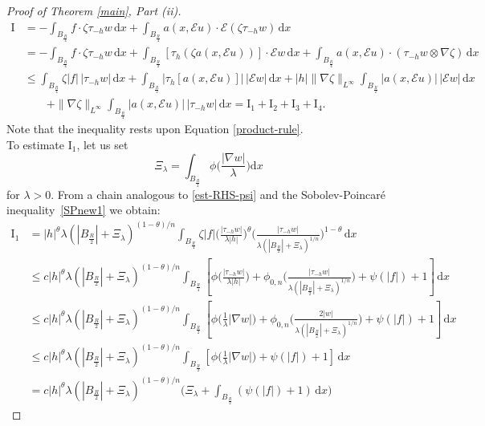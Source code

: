 \documentclass[leqno,11pt]{amsart}%
\numberwithin{equation}{section}
\def\d{\mathrm{d}}
\def\E{\mathcal{E}}
\def\dx{\d x}
\theoremstyle{definition}
\numberwithin{equation}{section}
\begin{document}
\begin{proof}[Proof of Theorem \ref{main}, Part (ii)]
\begin{align}\label{pre-I-bound}
  \mathrm{I}
  &=
  -\int_{B_{\frac R4}} f\cdot \zeta \tau_{-h}w\,\dx
  +
  \int_{B_{\frac R4}}  a(x,\E u) \cdot \E(\zeta\tau_{-h}w) \,\dx \\\nonumber
  &=
  -\int_{B_{\frac R4}} f\cdot \zeta \tau_{-h}w\,\dx
  +
  \int_{B_{\frac R2}}
  [ \tau_h(\zeta a(x,\E u))] \cdot \E w  
  \,\dx
  +
  \int_{B_{\frac R4}}a(x,\E u) \cdot (\tau_{-h}w\otimes
  \nabla\zeta)\,\dx\\\nonumber
  &
  \le
  \int_{B_{\frac R4}} \zeta|f|\,|\tau_{-h}w|\,\dx
  +
  \int_{B_{\frac R2}}
  |\tau_h[a(x,\E u)]|\,|\E w| \,\dx
  +
  |h|\|\nabla\zeta\|_{L^\infty}\int_{B_{\frac R2}}
  |a(x,\E u)|\,|\E w| \,\dx
\\\nonumber
  &\qquad
  +
  \|\nabla\zeta\|_{L^\infty}\int_{B_{\frac R4}}|a(x,\E u)|\,|\tau_{-h}w|\,\dx
  = \mathrm{I}_1+\mathrm{I}_2+\mathrm{I}_3+\mathrm{I}_4.
\end{align}
Note that the inequality rests upon Equation \eqref{product-rule}.
\\
To estimate $\mathrm{I}_1$, let us set 
$$\Xi_\lambda = \int_{B_{\frac R2}}\phi\Big(\frac{|\nabla w|}{\lambda}\Big)\dx$$
for $\lambda>0$. From a chain analogous to \eqref{est-RHS-psi} and the Sobolev-Poincar\'e inequality~\eqref{SPnew1} we obtain:
\begin{align}\label{aug10}
  \mathrm{I}_1&=|h|^{\theta}\lambda(|B_{\frac R2}|+\Xi_\lambda)^{({1-\theta})/n}\int_{B_{\frac R4}} \zeta|f|\bigg(\frac{|\tau_{-h}w|}{\lambda|h|}\bigg)^{\theta}\bigg(\frac{|\tau_{-h}w|}{\lambda (|B_{\frac R2}|+\Xi_\lambda)^{1/n}}\bigg)^{1-\theta}\,\dx\\ \nonumber
  &\le   c|h|^{\theta}\lambda(|B_{\frac R2}|+\Xi_\lambda)^{({1-\theta})/n}\int_{B_{\frac R4}}\left[\phi\bigg(\frac{|\tau_{-h}w|}{\lambda|h|}\bigg)+\phi_{0,n}\bigg(\frac{|\tau_{-h}w|}{\lambda(|B_{\frac R2}|+\Xi_\lambda)^{1/n}}\bigg)+\psi(|f|)+1\right]\, \dx\\
  &\le \nonumber
    c|h|^{\theta}\lambda(|B_{\frac R2}|+\Xi_\lambda)^{({1-\theta})/n}\int_{B_{\frac R2}}\left[\phi\big(\tfrac{1}{\lambda}|\nabla w|\big)
    +\phi_{0,n}\bigg(\frac{{  2}|w|}{\lambda(|B_{\frac R2}|+\Xi_\lambda)^{1/n}}\bigg)+\psi(|f|)+1\right]\, \dx\\
 &\le \nonumber
   c|h|^{\theta}\lambda(|B_{\frac R2}|+\Xi_\lambda)^{({1-\theta})/n}\int_{B_{\frac R2}}\left[\phi\big(\tfrac{1}{\lambda}|\nabla w|\big)+\psi(|f|)+1\right]\,\dx\\
    \nonumber &=
   c|h|^{\theta}\lambda(|B_{\frac R2}|+\Xi_\lambda)^{({1-\theta})/n}\bigg(\Xi_\lambda +\int_{B_{\frac R2}}(\psi(|f|)+1)\,\dx\bigg)

\end{align}
\end{proof}
\end{document}
